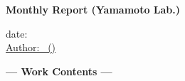 \documentclass[11pt, a4paper, twoside]{YReport_en}
\begin{document}
\thispagestyle{yrstylef}
\begin{center}
\Huge
{\bf Monthly Report (Yamamoto Lab.)}
\end{center}
%
\begin{flushright}
\vspace{5truemm}
\large
date: \YRdate \\
\underline{%
Author: \YRname \ (\YRgrade)
}
\\[4truemm]
\normalsize
\end{flushright}
%
\YRplan

\vspace{3.2truemm}
\begin{center}
{\large \bf --- Work Contents ---}
\vspace{-6truemm}
\end{center}
\hrulefill

\setlength{\baselineskip}{16truept}
	\YRachievement

\newpage


\end{document}
